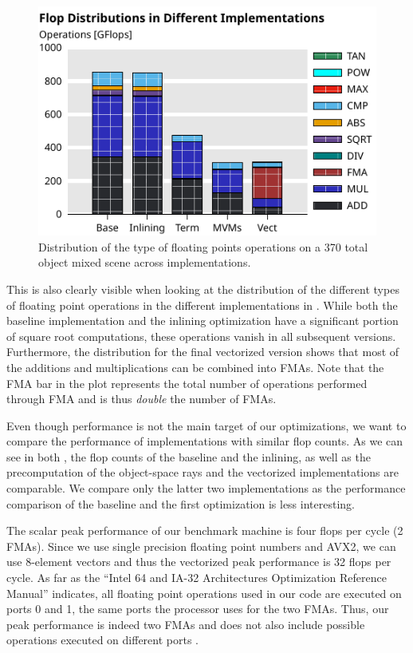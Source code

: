 \documentclass[letterpaper]{article}
\begin{document}
\begin{figure}[ht]
  \centering
  \includegraphics{Figures/rep-all-flops-hist.pdf}
  \caption{Distribution of the type of floating points operations on a 370 total object mixed scene across implementations.\label{fig:flops-all-hist}}
\end{figure}

This is also clearly visible when looking at the distribution of the different types of floating
point operations in the different implementations in .
While both the baseline implementation and the inlining optimization have a significant portion
of square root computations, these operations vanish in all subsequent versions.
Furthermore, the distribution for the final vectorized version shows that most of the additions
and multiplications can be combined into FMAs.
Note that the FMA bar in the plot represents the total number of operations performed through FMA
and is thus \emph{double} the number of FMAs.

Even though performance is not the main target of our optimizations, we want to compare the
performance of implementations with similar flop counts.
As we can see in both , the flop counts of the baseline 
and the inlining, as well as the precomputation of the object-space rays and the vectorized 
implementations are comparable.
We compare only the latter two implementations as the performance comparison of the baseline
and the first optimization is less interesting.

The scalar peak performance of our benchmark machine is four flops per cycle (2 FMAs).
Since we use single precision floating point numbers and AVX2, we can use 8-element vectors
and thus the vectorized peak performance is 32 flops per cycle.
As far as the ``Intel 64 and IA-32 Architectures Optimization Reference Manual'' indicates, all
floating point operations used in our code are executed on ports 0 and 1, the same ports
the processor uses for the two FMAs.
Thus, our peak performance is indeed two FMAs and does not also include possible operations executed on different ports \cite[Section~2.1]{intel:opt}.
\end{document}

